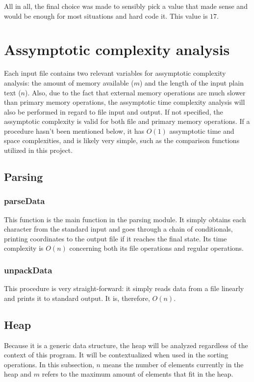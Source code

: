 \documentclass[10pt,a4paper]{article}
\numberwithin{equation}{section}
\begin{document}
All in all, the final choice was made to sensibly pick a value that made sense and would be enough for most situations and hard code it. This value is $17$. 

\section{Assymptotic complexity analysis}

Each input file contains two relevant variables for assymptotic complexity analysis: the amount of memory available ($m$) and the length of the input plain text ($n$). Also, due to the fact that external memory operations are much slower than primary memory operations, the assymptotic time complexity analysis will also be performed in regard to file input and output. If not specified, the assymptotic complexity is valid for both file and primary memory operations. If a procedure hasn't been mentioned below, it has $O(1)$ assymptotic time and space complexities, and is likely very simple, such as the comparison functions utilized in this project.

\subsection{Parsing}

\subsubsection{parseData}

This function is the main function in the parsing module. It simply obtains each character from the standard input and goes through a chain of conditionals, printing coordinates to the output file if it reaches the final state. Its time complexity is $O(n)$ concerning both its file operations and regular operations.

\subsubsection{unpackData}

This procedure is very straight-forward: it simply reads data from a file linearly and prints it to standard output. It is, therefore, $O(n)$.

\subsection{Heap}

Because it is a generic data structure, the heap will be analyzed regardless of the context of this program. It will be contextualized when used in the sorting operations. In this subsection, $n$ means the number of elements currently in the heap and $m$ refers to the maximum amount of elements that fit in the heap.
\end{document}

